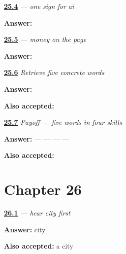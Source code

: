 \noindent\begin{minipage}[t]{\linewidth}
\raggedright
\hyperlink{review-GU-W21-ai-matra-copy}{\textbf{25.4}} \emph{ — one sign for ai}\par
\small \textbf{Answer:} \par
\end{minipage}\par\medskip

\noindent\begin{minipage}[t]{\linewidth}
\raggedright
\hyperlink{review-GU-C21-paisa-write}{\textbf{25.5}} \emph{ — money on the page}\par
\small \textbf{Answer:} \par
\end{minipage}\par\medskip

\noindent\begin{minipage}[t]{\linewidth}
\raggedright
\hyperlink{review-GU-R21-travel-five-recall}{\textbf{25.6}} \emph{Retrieve five concrete words}\par
\small \textbf{Answer:}  —  —  —  — \par
\footnotesize \textbf{Also accepted:}     
\end{minipage}\par\medskip

\noindent\begin{minipage}[t]{\linewidth}
\raggedright
\hyperlink{review-GU-C21-travel-five-payoff}{\textbf{25.7}} \emph{Payoff — five words in four skills}\par
\small \textbf{Answer:}  —  —  —  — \par
\footnotesize \textbf{Also accepted:}     
\end{minipage}\par\medskip

\section*{Chapter 26}

\noindent\begin{minipage}[t]{\linewidth}
\raggedright
\hyperlink{review-GU-C22-hear-shahar-recall}{\textbf{26.1}} \emph{ — hear city first}\par
\small \textbf{Answer:} city\par
\footnotesize \textbf{Also accepted:} a city
\end{minipage}\par\medskip

